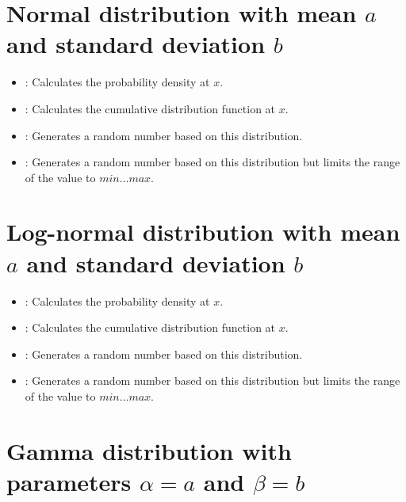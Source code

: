 \section{Normal distribution with mean \texorpdfstring{$a$}{a} and standard deviation \texorpdfstring{$b$}{b}}

\begin{itemize}

\item
{}:
Calculates the probability density at $x$.

\item
{}:
Calculates the cumulative distribution function at $x$.

\item
{}:
Generates a random number based on this distribution.

\item
{}:
Generates a random number based on this distribution but limits the range of the value to $min\ldots max$.

\end{itemize}



\section{Log-normal distribution with mean \texorpdfstring{$a$}{a} and standard deviation \texorpdfstring{$b$}{b}}

\begin{itemize}

\item
{}:
Calculates the probability density at $x$.

\item
{}:
Calculates the cumulative distribution function at $x$.

\item
{}:
Generates a random number based on this distribution.

\item
{}:
Generates a random number based on this distribution but limits the range of the value to $min\ldots max$.

\end{itemize}



\section{Gamma distribution with parameters \texorpdfstring{$\alpha=a$}{a} and \texorpdfstring{$\beta=b$}{b}}


